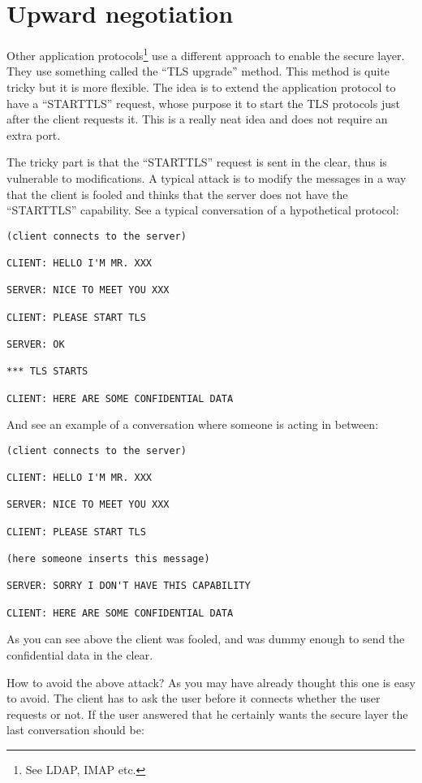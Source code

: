 \section{Upward negotiation}
Other application protocols\footnote{See LDAP, IMAP etc.}
use a different approach to enable the secure layer.
They use something called the ``TLS upgrade'' method. This method
is quite tricky but it is more flexible. The idea is to extend
the application protocol to have a ``STARTTLS'' request, whose purpose
it to start the TLS protocols just after the client requests it.
This is a really neat idea and does not require an extra port.
\par
The tricky part is that the ``STARTTLS'' request is sent in the clear,
thus is vulnerable to modifications. A typical attack is to modify the
messages in a way that the client is fooled and thinks that the server
does not have the ``STARTTLS'' capability. See a typical conversation
of a hypothetical protocol:
\begin{verbatim}
(client connects to the server)

CLIENT: HELLO I'M MR. XXX

SERVER: NICE TO MEET YOU XXX

CLIENT: PLEASE START TLS

SERVER: OK

*** TLS STARTS

CLIENT: HERE ARE SOME CONFIDENTIAL DATA

\end{verbatim}

And see an example of a conversation where someone is acting
in between:

\begin{verbatim}
(client connects to the server)

CLIENT: HELLO I'M MR. XXX

SERVER: NICE TO MEET YOU XXX

CLIENT: PLEASE START TLS

(here someone inserts this message)

SERVER: SORRY I DON'T HAVE THIS CAPABILITY

CLIENT: HERE ARE SOME CONFIDENTIAL DATA

\end{verbatim}

As you can see above the client was fooled, and was dummy enough
to send the confidential data in the clear.
\par
How to avoid the above attack? As you may have already thought
this one is easy to avoid. The client has to ask the user before it connects
whether the user requests \tls{} or not. If the user answered that he
certainly wants the secure layer the last conversation should be:

